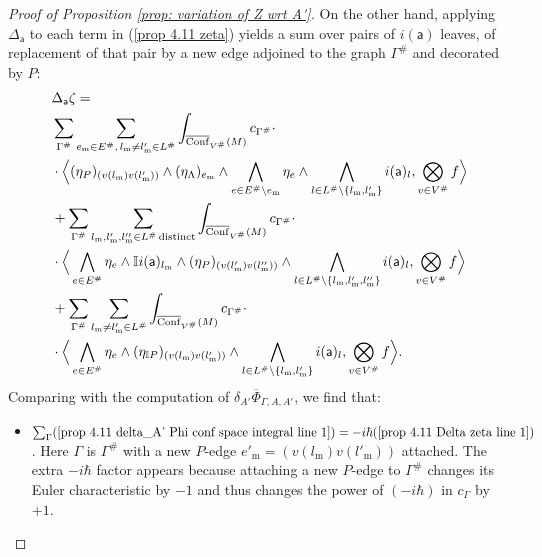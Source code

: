 \documentclass[11pt,a4paper]{amsart}
\theoremstyle{plain} %
\theoremstyle{definition}
\theoremstyle{remark}
\newcommand{\mr}{\mathrm}
\newcommand{\sfa}{\mathsf{a}}
\newcommand{\mm}{\mathrm{m}}
\newcommand{\II}{\mathbb{I}}
\begin{document}
{\begin{proof}[%
Proof of Proposition \ref{prop: variation of Z wrt A'}]
On the other hand, applying $\Delta_\sfa$ to each term in (\ref{prop 4.11 zeta}) yields a sum over  pairs of $i(\sfa)$ leaves, of replacement of that pair by a new edge adjoined to the graph $\Gamma^\#$ and decorated by $P$:
\begin{align}
    &\Delta_\sfa \zeta = \notag\\
    &\sum_{\Gamma^\#} \sum_{e_\mm\in E^\#,\, l_\mm\neq l'_\mm\in L^\#} \int_{\overline{\mr{Conf}}_{V^\#}(M)} c_{\Gamma^\#}\cdot  \label{prop 4.11 Delta zeta line 1} \\
    &\notag
     \cdot\Big\langle (\eta_P)_{(v(l_\mm) v(l'_\mm))} \wedge (\eta_\Lambda)_{e_\mm}\wedge 
    \bigwedge_{e\in E^\#\setminus e_\mm}\eta_e\wedge \bigwedge_{l\in L^\#\setminus\{l_\mm,l'_\mm\}} i(\sfa)_l,\bigotimes_{v\in V^\#} f \Big\rangle\\
    &+
    \sum_{\Gamma^\#} \sum_{l_\mm,l'_\mm,l''_\mm\in L^\#\,\mr{distinct}} \int_{\overline{\mr{Conf}}_{V^\#}(M)} c_{\Gamma^\#}\cdot \label{prop 4.11 Delta zeta line 2}\\
    & \notag  \cdot
    \Big\langle \bigwedge_{e\in E^\#}\eta_e\wedge \II i(\sfa)_{l_\mm} \wedge 
    (\eta_P)_{(v(l'_\mm) v(l''_\mm))} \wedge
    \bigwedge_{l\in L^\#\setminus \{l_\mm,l'_\mm,l''_\mm\}} i(\sfa)_l,\bigotimes_{v\in V^\#} f \Big\rangle\\
    &+\sum_{\Gamma^\#} \sum_{l_\mm\neq l'_\mm\in L^\#} \int_{\overline{\mr{Conf}}_{V^\#}(M)} c_{\Gamma^\#} \cdot \label{prop 4.11 Delta zeta line 3}
    \\ & \notag \cdot
    \Big\langle \bigwedge_{e\in E^\#}\eta_e\wedge (\eta_{\II P})_{(v(l_\mm) v(l'_\mm))}  \wedge \bigwedge_{l\in L^\#\setminus \{l_\mm, l'_\mm\} } i(\sfa)_l,\bigotimes_{v\in V^\#} f \Big\rangle.
\end{align}    
Comparing with the computation of $\delta_{A'}\overline\Phi_{\Gamma,A,A'}$, we find that:
\begin{itemize}
    \item $\sum_\Gamma (\ref{prop 4.11 delta_A' Phi conf space integral line 1})=-i\hbar(\ref{prop 4.11 Delta zeta line 1})$. Here $\Gamma$ is $\Gamma^\#$ with a new $P$-edge $e'_\mm=(v(l_\mm) v(l'_\mm))$ attached.  The extra $-i\hbar$ factor appears because attaching a new $P$-edge to $\Gamma^\#$ changes its Euler characteristic by $-1$ and thus changes the power of $(-i\hbar)$ in $c_\Gamma$ by $+1$. 

\end{itemize}
\end{proof}}
\end{document}
